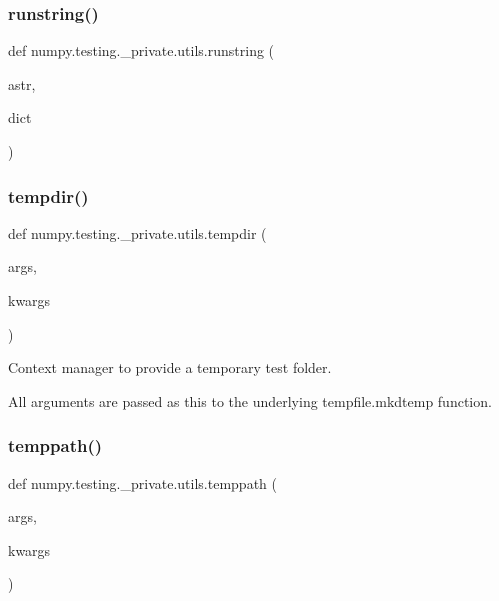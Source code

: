 \subsubsection{\texorpdfstring{runstring()}{runstring()}}
{\footnotesize\ttfamily def numpy.\+testing.\+\_\+private.\+utils.\+runstring (\begin{DoxyParamCaption}\item[{}]{astr,  }\item[{}]{dict }\end{DoxyParamCaption})}

\mbox{\label{namespacenumpy_1_1testing_1_1__private_1_1utils_a05901223fea3a962d09904ced2cbbabd}} 
\subsubsection{\texorpdfstring{tempdir()}{tempdir()}}
{\footnotesize\ttfamily def numpy.\+testing.\+\_\+private.\+utils.\+tempdir (\begin{DoxyParamCaption}\item[{}]{args,  }\item[{}]{kwargs }\end{DoxyParamCaption})}

\begin{DoxyVerb}Context manager to provide a temporary test folder.

All arguments are passed as this to the underlying tempfile.mkdtemp
function.\end{DoxyVerb}
 \mbox{\label{namespacenumpy_1_1testing_1_1__private_1_1utils_ab53b48d1f4f2593e39d1fe9be00b3cc8}} 
\subsubsection{\texorpdfstring{temppath()}{temppath()}}
{\footnotesize\ttfamily def numpy.\+testing.\+\_\+private.\+utils.\+temppath (\begin{DoxyParamCaption}\item[{}]{args,  }\item[{}]{kwargs }\end{DoxyParamCaption})}

